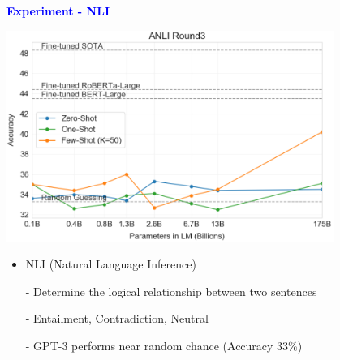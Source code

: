 \documentclass[professionalfont]{beamer}
\begin{document}
\begin{frame}

\begin{center}
    { \textbf{\textcolor{blue}{ {\fontsize{12}{14}\selectfont Experiment - NLI} }} }
\end{center}

\begin{center}
    \includegraphics[width=0.8\textwidth]{figure/3-9.png}
\end{center}

{\fontsize{10}{14}\selectfont 
\begin{itemize}
    \item NLI (Natural Language Inference)

    - Determine the logical relationship between two sentences

    - Entailment, Contradiction, Neutral

    - GPT-3 performs near random chance (Accuracy 33\%)

\end{itemize}
}

\end{frame}
\end{document}
